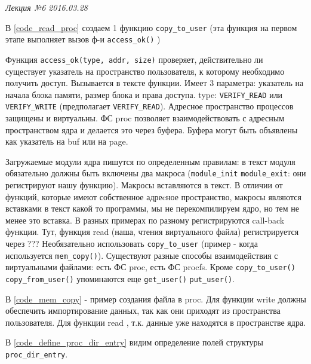 \clearpage
\begin{flushright}
	\textit{Лекция №6}
	\textit{2016.03.28}
\end{flushright}

 

В \ref{code_read_proc} создаем 1 функцию \verb|copy_to_user| (эта функция на первом этапе выполняет вызов ф-и \verb|access_ok()| )

Функция \verb|access_ok(type, addr, size)|   проверяет, действительно ли существует указатель на пространство пользователя, к которому необходимо получить доступ. Вызывается в тексте функции. Имеет 3 параметра: указатель на начала блока памяти, размер блока и права доступа. type: \verb|VERIFY_READ|  или \verb|VERIFY_WRITE| (предполагает  \verb|VERIFY_READ|). Адресное пространство процессов защищены и виртуальны. ФС proc позволяет взаимодействовать с адресным пространством ядра и делается это через буфера. Буфера могут быть объявлены как указатель на buf или на page. 

Загружаемые модули ядра пишутся по определенным правилам: в текст модуля обязательно должны быть включены два макроса (\verb|module_init| \verb|module_exit|: они регистрируют нашу функцию). Макросы вставляются в текст. В отличии от функций, которые имеют собственное адреcное пространство, макросы являются вставками в текст какой то программы, мы не перекомпилируем ядро, но тем не менее это вставка. В разных примерах по разному регистрируются call-back функции. Тут, функция read (наша, чтения виртуального файла) регистрируется через ???
Необязательно использовать \verb|copy_to_user| (пример - когда используется \verb|mem_copy()|).  Существуют разные способы взаимодействия с виртуальными файлами: есть ФС proc, есть ФС procfs.
Кроме \verb|copy_to_user()| \verb|copy_from_user()| упоминаются еще \verb|get_user()| \verb|put_user()|.

 

В \ref{code_mem_copy} - пример создания файла в proc. Для функции write должны обеспечить импортирование данных, так как они приходят из пространства пользователя. Для функции read , т.к. данные уже находятся в пространстве ядра. 



В \ref{code_define_proc_dir_entry} видим определение полей структуры \verb|proc_dir_entry|.

